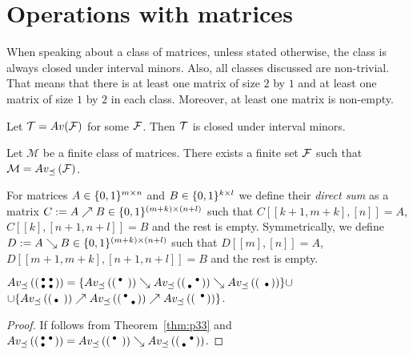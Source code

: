 \chapter{Operations with matrices}
When speaking about a class of matrices, unless stated otherwise, the class is always closed under interval minors. Also, all classes discussed are non-trivial. That means that there is at least one matrix of size $2$ by $1$ and at least one matrix of size $1$ by $2$ in each class. Moreover, at least one matrix is non-empty.

\begin{obs}
Let $\mathcal{T}=Av(\mathcal{F})$ for some $\mathcal{F}$. Then $\mathcal{T}$ is closed under interval minors.
\end{obs}

\begin{obs}
Let $\mathcal{M}$ be a finite class of matrices. There exists a finite set $\mathcal{F}$ such that $\mathcal{M}=Av_{\preceq}\left(\mathcal{F}\right)$.
\end{obs}

\begin{defn}
For matrices $A\in\{0,1\}^{m\times n}$ and $B\in\{0,1\}^{k\times l}$ we define their \emph{direct sum} as a matrix $C:=A\nearrow B\in\{0,1\}^{(m+k)\times(n+l)}$ such that $C[[k+1,m+k],[n]]=A$, $C[[k],[n+1,n+l]]=B$ and the rest is empty. Symmetrically, we define $D:=A\searrow B\in\{0,1\}^{(m+k)\times(n+l)}$ such that $D[[m],[n]]=A$, $D[[m+1,m+k],[n+1,n+l]]=B$ and the rest is empty.
\end{defn}

\begin{prop}
$Av_{\preceq}\left(\left(\begin{smallmatrix}\bullet&\bullet\\\bullet&\bullet\end{smallmatrix}\right)\right)=\{Av_{\preceq}\left(\left(\begin{smallmatrix}\bullet& \\ & \end{smallmatrix}\right)\right)\searrow Av_{\preceq}\left(\left(\begin{smallmatrix} &\bullet\\\bullet& \end{smallmatrix}\right)\right)\searrow Av_{\preceq}\left(\left(\begin{smallmatrix} & \\ &\bullet\end{smallmatrix}\right)\right)\}\cup$\\
$\cup\{Av_{\preceq}\left(\left(\begin{smallmatrix} & \\\bullet& \end{smallmatrix}\right)\right)\nearrow Av_{\preceq}\left(\left(\begin{smallmatrix}\bullet& \\ &\bullet\end{smallmatrix}\right)\right)\nearrow Av_{\preceq}\left(\left(\begin{smallmatrix} &\bullet\\ & \end{smallmatrix}\right)\right)\}$.
\end{prop}
\begin{proof}
If follows from Theorem~\ref{thm:p33} and $Av_{\preceq}\left(\left(\begin{smallmatrix}\bullet&\bullet\\\bullet& \end{smallmatrix}\right)\right)=Av_{\preceq}\left(\left(\begin{smallmatrix}\bullet& \\ & \end{smallmatrix}\right)\right)\searrow Av_{\preceq}\left(\left(\begin{smallmatrix} &\bullet\\\bullet& \end{smallmatrix}\right)\right)$.
\end{proof}

